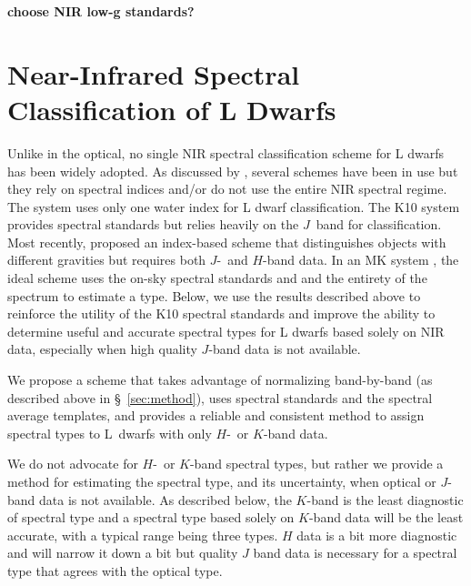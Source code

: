 \documentclass[12pt,preprint]{aastex}
\begin{document}

\textbf{choose NIR low-g standards?}

\section{Near-Infrared Spectral Classification of L Dwarfs}
\label{sec:classification}

Unlike in the optical, no single NIR spectral classification scheme for L dwarfs has been widely adopted. As discussed by \citet{Kirkpatrick05,Kirkpatrick10}, several schemes have been in use but they rely on spectral indices and/or do not use the entire NIR spectral regime. The \citet{Geballe02} system uses only one water index for L dwarf classification. The K10 system provides spectral standards but relies heavily on the $J$~band for classification. Most recently, \citet{Allers:2013hk} proposed an index-based scheme that distinguishes objects with different gravities but requires both $J$-~and $H$-band data.
In an MK system \citep{MK}, the ideal scheme uses the on-sky spectral standards and and the entirety of the spectrum to estimate a type. 
Below, we use the results described above to reinforce the utility of the K10 spectral standards and improve the ability to determine useful and accurate spectral types for L dwarfs based solely on NIR data, especially when high quality $J$-band data is not available.

We propose a scheme that takes advantage of normalizing band-by-band (as described above in \S~\ref{sec:method}), uses spectral standards and the spectral average templates, and provides a reliable and consistent method to assign spectral types to L~dwarfs with only $H$-~or $K$-band data. 

We do not advocate for $H$-~or $K$-band spectral types, but rather we provide a method for estimating the spectral type, and its uncertainty, when optical or $J$-band data is not available.
As described below, the $K$-band is the least diagnostic of spectral type and a spectral type based solely on $K$-band data will be the least accurate, with a typical range being three types. $H$ data is a bit more diagnostic and will narrow it down a bit but quality $J$ band data is necessary for a spectral type that agrees with the optical type.
\end{document}
